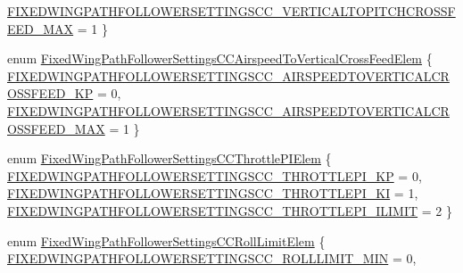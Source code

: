 \begin{DoxyCompactItemize}
\hyperlink{group___fixed_wing_path_follower_settings_c_c_ggae00bad2eb48611ca6d31ef42f48eb641a44a33317538164ac6414f64be7f53b63}{\-F\-I\-X\-E\-D\-W\-I\-N\-G\-P\-A\-T\-H\-F\-O\-L\-L\-O\-W\-E\-R\-S\-E\-T\-T\-I\-N\-G\-S\-C\-C\-\_\-\-V\-E\-R\-T\-I\-C\-A\-L\-T\-O\-P\-I\-T\-C\-H\-C\-R\-O\-S\-S\-F\-E\-E\-D\-\_\-\-M\-A\-X} = 1
 \}
\item 
enum \hyperlink{group___fixed_wing_path_follower_settings_c_c_ga7e97e2f5a8ea706bcc37611146bfe656}{\-Fixed\-Wing\-Path\-Follower\-Settings\-C\-C\-Airspeed\-To\-Vertical\-Cross\-Feed\-Elem} \{ \hyperlink{group___fixed_wing_path_follower_settings_c_c_gga7e97e2f5a8ea706bcc37611146bfe656a2b4129936c81b0a40780e2deaca0d2e3}{\-F\-I\-X\-E\-D\-W\-I\-N\-G\-P\-A\-T\-H\-F\-O\-L\-L\-O\-W\-E\-R\-S\-E\-T\-T\-I\-N\-G\-S\-C\-C\-\_\-\-A\-I\-R\-S\-P\-E\-E\-D\-T\-O\-V\-E\-R\-T\-I\-C\-A\-L\-C\-R\-O\-S\-S\-F\-E\-E\-D\-\_\-\-K\-P} = 0, 
\hyperlink{group___fixed_wing_path_follower_settings_c_c_gga7e97e2f5a8ea706bcc37611146bfe656a478597d10586e30123a0697b0c6c53fe}{\-F\-I\-X\-E\-D\-W\-I\-N\-G\-P\-A\-T\-H\-F\-O\-L\-L\-O\-W\-E\-R\-S\-E\-T\-T\-I\-N\-G\-S\-C\-C\-\_\-\-A\-I\-R\-S\-P\-E\-E\-D\-T\-O\-V\-E\-R\-T\-I\-C\-A\-L\-C\-R\-O\-S\-S\-F\-E\-E\-D\-\_\-\-M\-A\-X} = 1
 \}
\item 
enum \hyperlink{group___fixed_wing_path_follower_settings_c_c_ga6826b1c62599b4e66db3796b982019db}{\-Fixed\-Wing\-Path\-Follower\-Settings\-C\-C\-Throttle\-P\-I\-Elem} \{ \hyperlink{group___fixed_wing_path_follower_settings_c_c_gga6826b1c62599b4e66db3796b982019dba7faa0c3529f17fa8839b08648ee827b8}{\-F\-I\-X\-E\-D\-W\-I\-N\-G\-P\-A\-T\-H\-F\-O\-L\-L\-O\-W\-E\-R\-S\-E\-T\-T\-I\-N\-G\-S\-C\-C\-\_\-\-T\-H\-R\-O\-T\-T\-L\-E\-P\-I\-\_\-\-K\-P} = 0, 
\hyperlink{group___fixed_wing_path_follower_settings_c_c_gga6826b1c62599b4e66db3796b982019dba6dabf472706140d19c743a575bd8ef6a}{\-F\-I\-X\-E\-D\-W\-I\-N\-G\-P\-A\-T\-H\-F\-O\-L\-L\-O\-W\-E\-R\-S\-E\-T\-T\-I\-N\-G\-S\-C\-C\-\_\-\-T\-H\-R\-O\-T\-T\-L\-E\-P\-I\-\_\-\-K\-I} = 1, 
\hyperlink{group___fixed_wing_path_follower_settings_c_c_gga6826b1c62599b4e66db3796b982019dba972accb2f9cdbd90768db3ad6c2ba261}{\-F\-I\-X\-E\-D\-W\-I\-N\-G\-P\-A\-T\-H\-F\-O\-L\-L\-O\-W\-E\-R\-S\-E\-T\-T\-I\-N\-G\-S\-C\-C\-\_\-\-T\-H\-R\-O\-T\-T\-L\-E\-P\-I\-\_\-\-I\-L\-I\-M\-I\-T} = 2
 \}
\item 
enum \hyperlink{group___fixed_wing_path_follower_settings_c_c_gad2a8198985d78fc16e01d365a925b171}{\-Fixed\-Wing\-Path\-Follower\-Settings\-C\-C\-Roll\-Limit\-Elem} \{ \hyperlink{group___fixed_wing_path_follower_settings_c_c_ggad2a8198985d78fc16e01d365a925b171a9ec2c68c6c988a90321dafad1df1b52a}{\-F\-I\-X\-E\-D\-W\-I\-N\-G\-P\-A\-T\-H\-F\-O\-L\-L\-O\-W\-E\-R\-S\-E\-T\-T\-I\-N\-G\-S\-C\-C\-\_\-\-R\-O\-L\-L\-L\-I\-M\-I\-T\-\_\-\-M\-I\-N} = 0, 

\end{DoxyCompactItemize}

